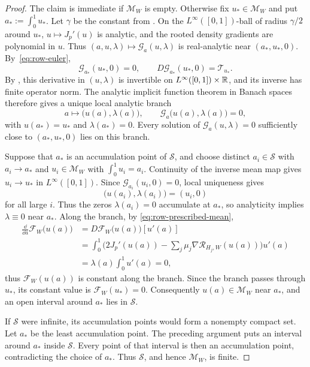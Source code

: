\begin{proof}
The claim is immediate if $\mathcal M_W$ is empty.
Otherwise fix $u_*\in\mathcal M_W$ and put $a_*:=\int_0^1u_*$.
Let $\gamma$ be the constant from .
On the $L^\infty([0,1])$-ball of radius $\gamma/2$ around $u_*$,
$u\mapsto J_p'(u)$ is analytic, and the rooted density gradients are
polynomial in $u$.  Thus $(a,u,\lambda)\mapsto\mathcal G_a(u,\lambda)$
is real-analytic near $(a_*,u_*,0)$.  By~\eqref{eq:row-euler},
\[
  \mathcal G_{a_*}(u_*,0)=0,\qquad
  D\mathcal G_{a_*}(u_*,0)=\mathcal T_{u_*}.
\]
By , this derivative in $(u,\lambda)$ is invertible
on $L^\infty([0,1])\times\mathbb R$, and its inverse has finite operator norm.
The analytic implicit function theorem in Banach spaces~\cite{Whittlesey1965}
therefore gives a unique local analytic branch
\[
  a\longmapsto\bigl(u(a),\lambda(a)\bigr),
  \qquad \mathcal G_a\bigl(u(a),\lambda(a)\bigr)=0,
\]
with $u(a_*)=u_*$ and $\lambda(a_*)=0$.
Every solution of $\mathcal G_a(u,\lambda)=0$ sufficiently close to
$(a_*,u_*,0)$ lies on this branch.

Suppose that $a_*$ is an accumulation point of $\mathcal S$, and choose distinct
$a_i\in\mathcal S$ with $a_i\to a_*$ and $u_i\in\mathcal M_W$ with
$\int_0^1u_i=a_i$.  Continuity of the inverse mean map gives
$u_i\to u_*$ in $L^\infty([0,1])$.  Since $\mathcal G_{a_i}(u_i,0)=0$,
local uniqueness gives
\[
  \bigl(u(a_i),\lambda(a_i)\bigr)=(u_i,0)
\]
for all large $i$.  Thus the zeros $\lambda(a_i)=0$ accumulate at $a_*$,
so analyticity implies
$\lambda\equiv0$ near $a_*$.  Along the branch, by \eqref{eq:row-prescribed-mean},
\begin{align*}
  \frac{\dd}{\dd a}\mathcal F_W\bigl(u(a)\bigr)
  &=D\mathcal F_W\bigl(u(a)\bigr)[u'(a)]\\
  &=\int_0^1\bigl(2J_p'(u(a))-\sum_j\mu_j\nabla\mathcal R_{H_j,W}(u(a))\bigr)u'(a)\\
  &=\lambda(a)\int_0^1u'(a)=0,
\end{align*}
thus $\mathcal F_W(u(a))$ is constant along the branch.
Since the branch passes through $u_*$, its constant value is
$\mathcal F_W(u_*)=0$.
Consequently $u(a)\in\mathcal M_W$ near $a_*$, and an open interval
around $a_*$ lies in $\mathcal S$.

If $\mathcal S$ were infinite, its accumulation points would form a
nonempty compact set.  Let $a_*$ be the least accumulation point.
The preceding argument puts an interval around $a_*$ inside $\mathcal S$.
Every point of that interval is then an accumulation point, contradicting
the choice of $a_*$.  Thus $\mathcal S$, and hence $\mathcal M_W$, is finite.
\end{proof}

